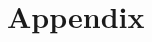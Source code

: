 \documentclass[final]{ieee}
\begin{document}
\begin{thebibliography}{99}
  










\end{thebibliography}

\newpage

\hbox{}


\newpage

\thispagestyle{empty}

\onecolumn

\section*{Appendix}
\end{document}
